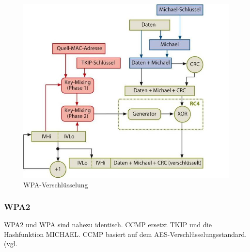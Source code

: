 \begin{figure} [htb]
\begin{centering}
\includegraphics[scale=0.6]{Bilder/Kapitel2/wpa_funktionsweise.jpg}
\caption[WPA-Verschlüsselung]{WPA-Verschlüsselung \cite{Heise-WLAN}}
\label{wpa_funktionsweise}
\end{centering}
\end{figure}

\subsubsection{\ac{WPA2}}
\ac{WPA2} und \ac{WPA} sind nahezu identisch. \ac{CCMP} ersetzt \ac{TKIP} und die Hashfunktion MICHAEL. \ac{CCMP} basiert auf dem \ac{AES}-Verschlüsselungsstandard. (vgl. \cite{WPA2}
